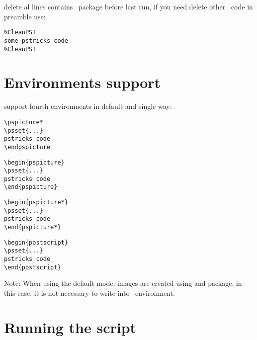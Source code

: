 \documentclass[11pt,english,BCOR10mm,DIV12,bibliography=totoc,parskip=false,smallheadings
    headexclude,footexclude,oneside]{pst-doc}
\begin{document}
\noindent

 delete al lines contains \PST\ package before last run, if you need delete other \PST\ code in preamble use:

\begin{verbatim}
%CleanPST
some pstricks code
%CleanPST
\end{verbatim}

\section{Environments support}
 support fourth environments in default and single way:

\vspace{10pt}
\begin{minipage}[c]{0.25\textwidth}
\begin{verbatim}
\pspicture*
\psset{...}
pstricks code
\endpspicture
\end{verbatim}
\end{minipage}
\begin{minipage}[c]{0.25\textwidth}
\begin{verbatim}
\begin{pspicture}
\psset{...}
pstricks code
\end{pspicture}
\end{verbatim}
\end{minipage}
\begin{minipage}[c]{0.25\textwidth}
\begin{verbatim}
\begin{pspicture*}
\psset{...}
pstricks code
\end{pspicture*}
\end{verbatim}
\end{minipage}
\begin{minipage}[c]{0.25\textwidth}
\begin{verbatim}
\begin{postscript}
\psset{...}
pstricks code
\end{postscript}
\end{verbatim}
\end{minipage}

\vspace{10pt}
Note: When using the default mode, images are created using  and  package, in this case, it is not necessary
to write  into \PST\ environment.

\newpage

\section{Running the script}
\end{document}
